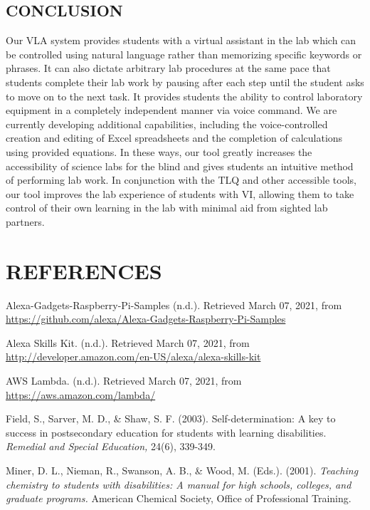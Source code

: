 \documentclass[11.5pt]{sig-alternate} %
\begin{document}
\begin{large}
\section*{CONCLUSION}

Our VLA system provides students with a virtual assistant in the lab which can be controlled using natural language rather than memorizing specific keywords or phrases. It can also dictate arbitrary lab procedures at the same pace that students complete their lab work by pausing after each step until the student asks to move on to the next task. It provides students the ability to control laboratory equipment in a completely independent manner via voice command. We are currently developing additional capabilities, including the voice-controlled creation and editing of Excel spreadsheets and the completion of calculations using provided equations. In these ways, our tool greatly increases the accessibility of science labs for the blind and gives students an intuitive method of performing lab work. In conjunction with the TLQ and other accessible tools, our tool improves the lab experience of students with VI, allowing them to take control of their own learning in the lab with minimal aid from sighted lab partners. 

\end{large}
 
\section*{REFERENCES}\par 

\leftskip 0.25in
\parindent -0.25in 

Alexa-Gadgets-Raspberry-Pi-Samples (n.d.). Retrieved March 07, 2021, from \url{https://github.com/alexa/Alexa-Gadgets-Raspberry-Pi-Samples}

Alexa Skills Kit. (n.d.). Retrieved March 07, 2021, from \url{http://developer.amazon.com/en-US/alexa/alexa-skills-kit}

AWS Lambda. (n.d.). Retrieved March 07, 2021, from \url{https://aws.amazon.com/lambda/}

Field, S., Sarver, M. D., \& Shaw, S. F. (2003). Self-determin\-ation: A key to success in postsecondary education for students with learning disabilities. \textit{Remedial and Special Education,} 24(6), 339-349.

Miner, D. L., Nieman, R., Swanson, A. B., \& Wood, M. (Eds.). (2001). \textit{Teaching chemistry to students with disabilities: A manual for high schools, colleges, and graduate programs.} American Chemical Society, Office of Professional Training.
\end{document}
